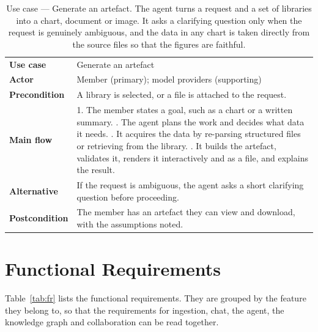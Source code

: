 \begin{table}[H]
  \centering
  \caption{Use case --- Generate an artefact. The agent turns a request and a set
  of libraries into a chart, document or image. It asks a clarifying question only
  when the request is genuinely ambiguous, and the data in any chart is taken
  directly from the source files so that the figures are faithful.}
  \label{tab:uc-agent}
  \small
  \begin{tabularx}{\textwidth}{@{}p{}X@{}}
    \toprule
    \textbf{Use case}      & Generate an artefact \\
    \textbf{Actor}         & Member (primary); model providers (supporting) \\
    \textbf{Precondition}  & A library is selected, or a file is attached to the request. \\
    \midrule
    \textbf{Main flow}     & 1. The member states a goal, such as a chart or a written summary. \newline
                             2. The agent plans the work and decides what data it needs. \newline
                             3. It acquires the data by re-parsing structured files or retrieving from the library. \newline
                             4. It builds the artefact, validates it, renders it interactively and as a file, and explains the result. \\
    \textbf{Alternative}   & If the request is ambiguous, the agent asks a short clarifying question before proceeding. \\
    \textbf{Postcondition} & The member has an artefact they can view and download, with the assumptions noted. \\
    \bottomrule
  \end{tabularx}
\end{table}

\section{Functional Requirements}

Table~\ref{tab:fr} lists the functional requirements. They are grouped by the
feature they belong to, so that the requirements for ingestion, chat, the agent,
the knowledge graph and collaboration can be read together.

